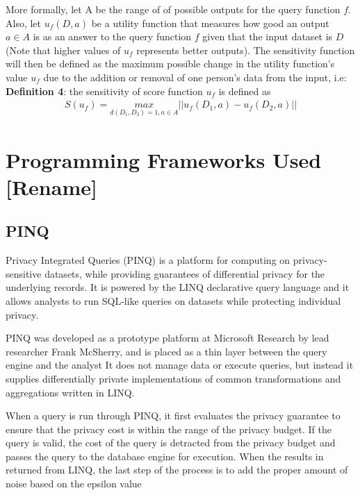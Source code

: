 More formally, let A be the range of of possible outputs for the query function $f$. Also, let $u_f(D,a)$ be a utility function that measures how good an output $a\in A$ is as an answer to the query function $f$ given that the input dataset is $D$ (Note that higher values of $u_f$ represents better outputs). The sensitivity function will then be defined as the maximum possible change in the utility function's value $u_f$ due to the addition or removal of one person's data from the input, i.e: \newline
\textbf{Definition 4}: the sensitivity of score function $u_f$ is defined as
\begin{eqnarray} \label{ExpoMecDef}
S(u_f) = \underset{d(D_1,D_2)=1,a\in A}{max}||u_f(D_1, a)-u_f(D_2,a)||
 \end{eqnarray}
 
 \section{Programming Frameworks Used [Rename]}
 
 \subsection{PINQ}
 Privacy Integrated Queries (PINQ) is a platform for computing on privacy-sensitive datasets, while providing guarantees of differential privacy for the underlying records. It is powered by the LINQ declarative query language and it allows analysts to run SQL-like queries on datasets while protecting individual privacy. 
 
 PINQ was developed as a prototype platform at Microsoft Research by lead researcher Frank McSherry\cite{mcsherry2009PINQ}, and is placed as a thin layer between the query engine and the analyst 
  \newline
It does not manage data or execute queries, but instead it supplies differentially private implementations of common transformations and aggregations written in LINQ. 

When a query is run through PINQ, it first evaluates the privacy guarantee to ensure that the privacy cost is within the range of the privacy budget. If the query is valid, the cost of the query is detracted from the privacy budget and passes the query to the database engine for execution. When the results in returned from LINQ, the last step of the process is to add the proper amount of noise based on the epsilon value  
 
